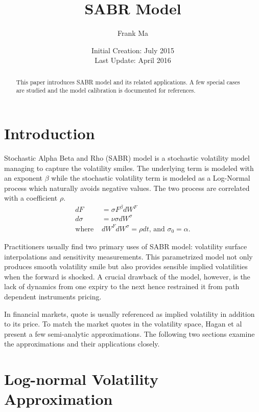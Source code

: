 \documentclass{article}
\title{SABR Model}
\author{Frank Ma}
\date{Initial Creation: July 2015 \\ Last Update: April 2016}
\begin{document}
\maketitle

\begin{abstract}
    This paper introduces SABR model and its related applications.
    A few special cases are studied and the model calibration is documented for references.
\end{abstract}

\section{Introduction}

Stochastic Alpha Beta and Rho (SABR) model is a stochastic volatility model managing to capture the volatility smiles.
The underlying term is modeled with an exponent $ \beta $ while the stochastic volatility term is modeled as a Log-Normal process which naturally avoids negative values.
The two process are correlated with a coefficient $ \rho $.
\begin{align}
    d F &= \sigma F^{\beta} d W^F \\
    d \sigma &= \nu \sigma d W^{\sigma} \\
    \text{where } & d W^F d W^{\sigma} = \rho d t \text{, and } {\sigma}_0 = \alpha \text{.}\nonumber
\end{align}

Practitioners usually find two primary uses of SABR model: volatility surface interpolations and sensitivity measurements.
This parametrized model not only produces smooth volatility smile but also provides sensible implied volatilities when the forward is shocked.
A crucial drawback of the model, however, is the lack of dynamics from one expiry to the next hence restrained it from path dependent instruments pricing.

In financial markets, quote is usually referenced as implied volatility in addition to its price.
To match the market quotes in the volatility space, Hagan et al \cite{Managing Smile Risk} present a few semi-analytic approximations.
The following two sections examine the approximations and their applications closely.


\section{Log-normal Volatility Approximation}
\end{document}
